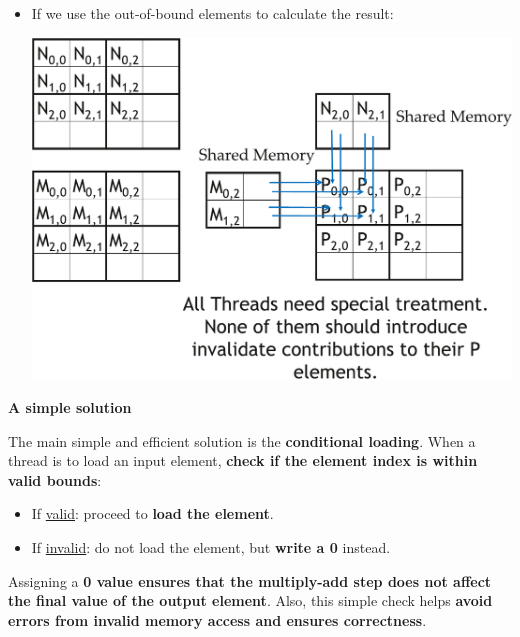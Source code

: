 \begin{examplebox}
\begin{itemize}
        \item If we use the out-of-bound elements to calculate the result:
        \begin{center}
            \includegraphics[width=.8\textwidth]{img/cuda-any-size-tile-3.pdf}
        \end{center}
    \end{itemize}
\end{examplebox}

\highspace
\begin{flushleft}
    \textcolor{Green3}{ \textbf{A simple solution}}
\end{flushleft}
The main simple and efficient solution is the \textbf{conditional loading}. When a thread is to load an input element, \textbf{check if the element index is within valid bounds}:
\begin{itemize}
    \item If \underline{valid}: proceed to \textbf{load the element}.
    \item If \underline{invalid}: do not load the element, but \textbf{write a 0} instead.
\end{itemize}
Assigning a \textbf{0 value ensures that the multiply-add step does not affect the final value of the output element}. Also, this simple check helps \textbf{avoid errors from invalid memory access and ensures correctness}.

